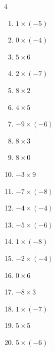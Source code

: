\begin{multicols}{4}
\begin{enumerate}
  \item $1\times (-5)$
        \phantom{$=-5$}

  \item $0\times (-4)$
        \phantom{$=0$}

  \item $5\times 6$
        \phantom{$=30$}

  \item $2\times (-7)$
        \phantom{$=-14$}

  \item $8\times 2$
        \phantom{$=16$}

  \item $4\times 5$
        \phantom{$=20$}

  \item $-9\times (-6)$
        \phantom{$=54$}

  \item $8\times 3$
        \phantom{$=24$}

  \item $8\times 0$
        \phantom{$=0$}

  \item $-3\times 9$
        \phantom{$=-27$}

  \item $-7\times (-8)$
        \phantom{$=56$}

  \item $-4\times (-4)$
        \phantom{$=16$}

  \item $-5\times (-6)$
        \phantom{$=30$}

\columnbreak %

  \item $1\times (-8)$
        \phantom{$=-8$}

  \item $-2\times (-4)$
        \phantom{$=8$}

  \item $0\times 6$
        \phantom{$=0$}

  \item $-8\times 3$
        \phantom{$=-24$}

  \item $1\times (-7)$
        \phantom{$=-7$}

  \item $5\times 5$
        \phantom{$=25$}

  \item $5\times (-6)$
        \phantom{$=-30$}


\end{enumerate}
\end{multicols}
